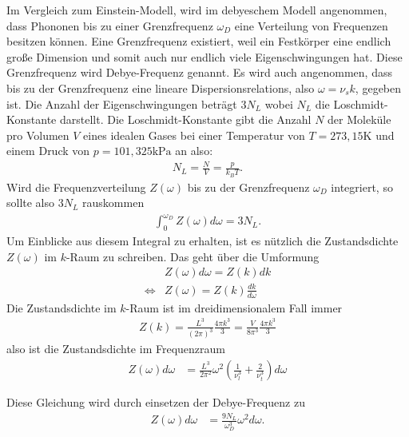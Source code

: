 Im Vergleich zum Einstein-Modell, wird im debyeschem Modell angenommen, dass Phononen bis zu einer Grenzfrequenz $\omega_D$ eine Verteilung von Frequenzen besitzen können. 
Eine Grenzfrequenz existiert, weil ein Festkörper eine endlich große Dimension und somit auch nur endlich viele Eigenschwingungen hat. Diese Grenzfrequenz wird Debye-Frequenz genannt. Es wird auch angenommen, 
dass bis zu der Grenzfrequenz eine lineare Dispersionsrelations, also $\omega = \nu_s k$, gegeben ist. 
Die Anzahl der Eigenschwingungen beträgt $3 N_L$ wobei $N_L$ die Loschmidt-Konstante darstellt. Die Loschmidt-Konstante gibt die Anzahl $N$ der Moleküle pro Volumen $V$ eines idealen Gases 
bei einer Temperatur von $T = 273,15 \si{\kelvin}$ und einem Druck von $p = 101,325 \si{\kilo\pascal}$ an also:
\begin{align*}
    N_L = \frac{N}{V} = \frac{p}{k_B T}.
\end{align*}
Wird die Frequenzverteilung $Z(\omega)$ bis zu der Grenzfrequenz $\omega_D$ integriert, so sollte also $3 N_L$ rauskommen
\begin{align*}
    \int_0^{\omega_D} Z(\omega) d\omega = 3 N_L .
\end{align*}
Um Einblicke aus diesem Integral zu erhalten, ist es nützlich die Zustandsdichte $Z(\omega)$ im $k$-Raum zu schreiben. Das geht über die Umformung 
\begin{align*}
    &Z(\omega) d\omega = Z(k) d k\\
    \Leftrightarrow& Z(\omega) = Z(k) \frac{d k}{d\omega}
\end{align*}
Die Zustandsdichte im $k$-Raum ist im dreidimensionalem Fall immer 
\begin{align*}
    Z(k) = \frac{L^3}{\left(2 \pi\right)^3} \frac{4 \pi k^3}{3} = \frac{V}{8 \pi^3} \frac{4 \pi k^3}{3}
\end{align*}
also ist die Zustandsdichte im Frequenzraum
\begin{align*}
    Z(\omega) d \omega&= \frac{L^3}{2 \pi^2} \omega^2 \left(\frac{1}{\nu^3_l} + \frac{2}{\nu^3_t}\right)  d\omega 
\end{align*}

Diese Gleichung wird durch einsetzen der Debye-Frequenz zu
\begin{align*}
    Z(\omega) d \omega&= \frac{9 N_L}{\omega_D^3} \omega^2 d \omega.
\end{align*}

